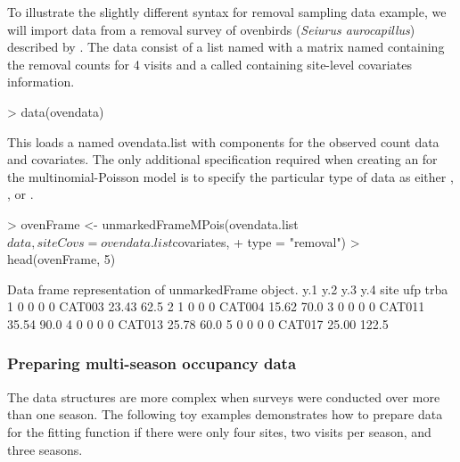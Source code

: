\documentclass[article,shortnames]{jss}
\begin{document}
{To illustrate the slightly different syntax for removal sampling data example, 
we will import data from a removal survey of ovenbirds 
({\it Seiurus aurocapillus}) described by \citet{Royle2004a}.  The data consist 
of a list named  with 
a matrix named  containing the removal counts for 4 visits and a 
 called  containing site-level covariates 
information.

\begin{Schunk}
\begin{Sinput}
> data(ovendata)
\end{Sinput}
\end{Schunk}

This loads a  named ovendata.list with components for the 
observed count data and covariates.  The only additional specification 
required when creating an  for the multinomial-Poisson
model is to specify the particular type of data as either 
, , or .

\begin{Schunk}
\begin{Sinput}
> ovenFrame <- unmarkedFrameMPois(ovendata.list$data, siteCovs = ovendata.list$covariates, 
+     type = "removal")
> head(ovenFrame, 5)
\end{Sinput}
\begin{Soutput}
Data frame representation of unmarkedFrame object.
  y.1 y.2 y.3 y.4   site   ufp  trba
1   0   0   0   0 CAT003 23.43  62.5
2   1   0   0   0 CAT004 15.62  70.0
3   0   0   0   0 CAT011 35.54  90.0
4   0   0   0   0 CAT013 25.78  60.0
5   0   0   0   0 CAT017 25.00 122.5
\end{Soutput}
\end{Schunk}

\subsubsection{Preparing multi-season occupancy data}

The data structures are more complex when surveys were conducted over more 
than one season. The following toy examples demonstrates how to prepare data
for the  fitting function if there were only four sites, two
visits per season, and three seasons.

}
\end{document}
